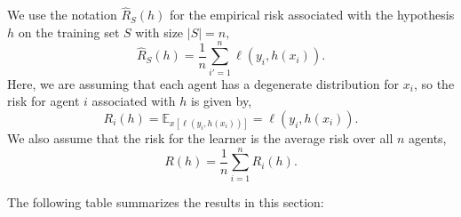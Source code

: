 \documentclass{article}
\begin{document}
\newline \newline
We use the notation $\hat{R}_{S}\left(h \right)$ for the empirical risk associated with the hypothesis $h $ on the training set $S $ with size $\left| S \right| = n, $
\begin{equation} 
\hat{R}_{S}\left(h \right) = \dfrac{1}{n} \displaystyle\sum_{i' = 1}^{n} \ell\left(y_{i}, h\left(x_{i}\right)\right).
\end{equation}
Here, we are assuming that each agent has a degenerate distribution for $x_{i}$, so the risk for agent $i $ associated with $h $ is given by,
\begin{equation} 
R_{i}\left(h\right) = \mathbb{E}_{x\left[\ell\left(y_{i}, h\left(x_{i}\right)\right)\right]} = \ell\left(y_{i}, h\left(x_{i}\right)\right).
\end{equation}
We also assume that the risk for the learner is the average risk over all $n $ agents,
\begin{equation} 
R(h) = \dfrac{1}{n} \displaystyle\sum_{i=1}^{n} R_{i}\left(h\right).
\end{equation}

The following table summarizes the results in this section:
\end{document}
